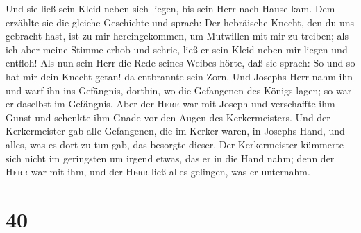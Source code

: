  Und sie ließ sein Kleid neben sich liegen, bis sein Herr
nach Hause kam.  Dem erzählte sie die gleiche Geschichte
und sprach: Der hebräische Knecht, den du uns gebracht hast, ist zu mir
hereingekommen, um Mutwillen mit mir zu treiben;  als ich
aber meine Stimme erhob und schrie, ließ er sein Kleid neben mir liegen
und entfloh!  Als nun sein Herr die Rede seines Weibes
hörte, daß sie sprach: So und so hat mir dein Knecht getan! da
entbrannte sein Zorn.  Und Josephs Herr nahm ihn und warf
ihn ins Gefängnis, dorthin, wo die Gefangenen des Königs lagen; so war
er daselbst im Gefängnis.  Aber der \textsc{Herr} war mit
Joseph und verschaffte ihm Gunst und schenkte ihm Gnade vor den Augen
des Kerkermeisters.  Und der Kerkermeister gab alle
Gefangenen, die im Kerker waren, in Josephs Hand, und alles, was es dort
zu tun gab, das besorgte dieser.  Der Kerkermeister
kümmerte sich nicht im geringsten um irgend etwas, das er in die Hand
nahm; denn der \textsc{Herr} war mit ihm, und der \textsc{Herr} ließ
alles gelingen, was er unternahm.

\hypertarget{section-39}{%
\section{40}\label{section-39}}

